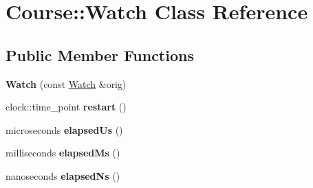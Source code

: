 \hypertarget{class_course_1_1_watch}{\section{Course\-:\-:Watch Class Reference}
\label{class_course_1_1_watch}
}
\subsection*{Public Member Functions}
\begin{DoxyCompactItemize}
\item 
\hypertarget{class_course_1_1_watch_aaf7a7fe27ac33bec5d1a27efd8c9f2d9}{{\bfseries Watch} (const \hyperlink{class_course_1_1_watch}{Watch} \&orig)}\label{class_course_1_1_watch_aaf7a7fe27ac33bec5d1a27efd8c9f2d9}

\item 
\hypertarget{class_course_1_1_watch_aef52558b27c9bd2a22a3d825b56a1ee0}{clock\-::time\-\_\-point {\bfseries restart} ()}\label{class_course_1_1_watch_aef52558b27c9bd2a22a3d825b56a1ee0}

\item 
\hypertarget{class_course_1_1_watch_a51a5229369c546c85bdb04b83c92d7e9}{microseconds {\bfseries elapsed\-Us} ()}\label{class_course_1_1_watch_a51a5229369c546c85bdb04b83c92d7e9}

\item 
\hypertarget{class_course_1_1_watch_a768ec33c03e9462c89ccffcdfbb012d6}{milliseconds {\bfseries elapsed\-Ms} ()}\label{class_course_1_1_watch_a768ec33c03e9462c89ccffcdfbb012d6}

\item 
\hypertarget{class_course_1_1_watch_a0fc332c273e9f8ef06b95cfcad7fe42f}{nanoseconds {\bfseries elapsed\-Ns} ()}\label{class_course_1_1_watch_a0fc332c273e9f8ef06b95cfcad7fe42f}

\end{DoxyCompactItemize}

